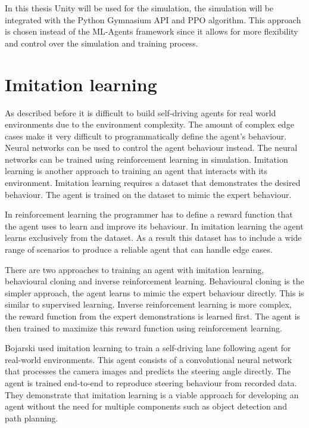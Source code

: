 In this thesis Unity will be used for the simulation, the simulation will be integrated with the Python Gymnasium API and PPO algorithm. This approach is chosen instead of the ML-Agents framework since it allows for more flexibility and control over the simulation and training process.


\section{Imitation learning}
As described before it is difficult to build self-driving agents for real world environments due to the environment complexity. The amount of complex edge cases make it very difficult to programmatically define the agent's behaviour. Neural networks can be used to control the agent behaviour instead. The neural networks can be trained using reinforcement learning in simulation. 
Imitation learning is another approach to training an agent that interacts with its environment. Imitation learning requires a dataset that demonstrates the desired behaviour. The agent is trained on the dataset to mimic the expert behaviour.

In reinforcement learning the programmer has to define a reward function that the agent uses to learn and improve its behaviour. In imitation learning the agent learns exclusively from the dataset. As a result this dataset has to include a wide range of scenarios to produce a reliable agent that can handle edge cases.

There are two approaches to training an agent with imitation learning, behavioural cloning and inverse reinforcement learning. Behavioural cloning is the simpler approach, the agent learns to mimic the expert behaviour directly. This is similar to supervised learning. Inverse reinforcement learning is more complex, the reward function from the expert demonstrations is learned first. The agent is then trained to maximize this reward function using reinforcement learning. 

Bojarski \autocite{bojarski2016endToEnd} used imitation learning to train a self-driving lane following agent for real-world environments. This agent consists of a convolutional neural network that processes the camera images and predicts the steering angle directly. The agent is trained end-to-end to reproduce steering behaviour from recorded data. They demonstrate that imitation learning is a viable approach for developing an agent without the need for multiple components such as object detection and path planning.

